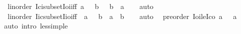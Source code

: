 \begin{isabellebody}
\endisatagproof
{\isafoldproof}%
%
\isadelimproof
\isanewline
%
\endisadelimproof
\isanewline
{}\isamarkupfalse%
\ {\isacharparenleft}{\kern0pt}\ linorder{\isacharparenright}{\kern0pt}\ Ici{\isacharunderscore}{\kern0pt}subset{\isacharunderscore}{\kern0pt}Ioi{\isacharunderscore}{\kern0pt}iff{\isacharcolon}{\kern0pt}\ {\isachardoublequoteopen}{\isacharbraceleft}{\kern0pt}a\ {\isachardot}{\kern0pt}{\isachardot}{\kern0pt}{\isacharbraceright}{\kern0pt}\ {\isasymsubseteq}\ {\isacharbraceleft}{\kern0pt}b\ {\isacharless}{\kern0pt}{\isachardot}{\kern0pt}{\isachardot}{\kern0pt}{\isacharbraceright}{\kern0pt}\ {\isasymlongleftrightarrow}\ b\ {\isacharless}{\kern0pt}\ a{\isachardoublequoteclose}\isanewline
%
\isadelimproof
\ \ %
\endisadelimproof
%
\isatagproof
{}\isamarkupfalse%
\ auto%
\endisatagproof
{\isafoldproof}%
%
\isadelimproof
\isanewline
%
\endisadelimproof
\isanewline
{}\isamarkupfalse%
\ {\isacharparenleft}{\kern0pt}\ linorder{\isacharparenright}{\kern0pt}\ Iic{\isacharunderscore}{\kern0pt}subset{\isacharunderscore}{\kern0pt}Iio{\isacharunderscore}{\kern0pt}iff{\isacharcolon}{\kern0pt}\ {\isachardoublequoteopen}{\isacharbraceleft}{\kern0pt}{\isachardot}{\kern0pt}{\isachardot}{\kern0pt}\ a{\isacharbraceright}{\kern0pt}\ {\isasymsubseteq}\ {\isacharbraceleft}{\kern0pt}{\isachardot}{\kern0pt}{\isachardot}{\kern0pt}{\isacharless}{\kern0pt}\ b{\isacharbraceright}{\kern0pt}\ {\isasymlongleftrightarrow}\ a\ {\isacharless}{\kern0pt}\ b{\isachardoublequoteclose}\isanewline
%
\isadelimproof
\ \ %
\endisadelimproof
%
\isatagproof
{}\isamarkupfalse%
\ auto%
\endisatagproof
{\isafoldproof}%
%
\isadelimproof
\isanewline
%
\endisadelimproof
\isanewline
{}\isamarkupfalse%
\ {\isacharparenleft}{\kern0pt}\ preorder{\isacharparenright}{\kern0pt}\ Ioi{\isacharunderscore}{\kern0pt}le{\isacharunderscore}{\kern0pt}Ico{\isacharcolon}{\kern0pt}\ {\isachardoublequoteopen}{\isacharbraceleft}{\kern0pt}a\ {\isacharless}{\kern0pt}{\isachardot}{\kern0pt}{\isachardot}{\kern0pt}{\isacharbraceright}{\kern0pt}\ {\isasymsubseteq}\ {\isacharbraceleft}{\kern0pt}a\ {\isachardot}{\kern0pt}{\isachardot}{\kern0pt}{\isacharbraceright}{\kern0pt}{\isachardoublequoteclose}\isanewline
%
\isadelimproof
\ \ %
\endisadelimproof
%
\isatagproof
{}\isamarkupfalse%
\ {\isacharparenleft}{\kern0pt}auto\ intro{\isacharcolon}{\kern0pt}\ less{\isacharunderscore}{\kern0pt}imp{\isacharunderscore}{\kern0pt}le{\isacharparenright}{\kern0pt}%
\endisatagproof
{\isafoldproof}%
%
\isadelimproof

\end{isabellebody}
